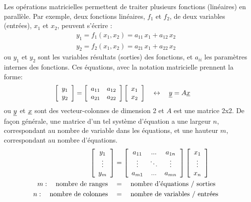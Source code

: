 Les opérations matricielles permettent de traiter plusieurs fonctions (linéaires) en parallèle. Par exemple, deux fonctions linéaires, $f_1$ et $f_2$, de deux variables (entrées), $x_1$ et $x_2$, peuvent s’écrire :
%
\begin{align}
y_1 = f_1(x_1,x_2) = a_{11} \, x_1 + a_{12} \, x_2   \\
y_2 = f_2(x_1,x_2) = a_{21} \, x_1 + a_{22} \, x_2
\end{align}
%
ou $y_1$ et $y_2$ sont les variables résultats (sorties) des fonctions, et $a_{ii}$ les paramètres internes des fonctions. Ces équations, avec la notation matricielle prennent la forme:
%
\begin{align}
\left[ \begin{array}{c} 
	y_1 \\ y_2
\end{array} \right] &= 
\left[ \begin{array}{c c} 
a_{11} & a_{12} \\ a_{21} & a_{22}
\end{array} \right]
\left[ \begin{array}{c} 
	x_1 \\ x_2
\end{array} \right] \quad \leftrightarrow \quad  \underline{y}  =   A  \underline{x} 
\label{eq:sys2}
\end{align}
%
ou $\underline{y}$ et $\underline{x}$ sont des vecteur-colonnes de dimension 2 et $A$ est une matrice 2x2. De façon générale, une matrice d'un tel système d’équation a une largeur $n$, correspondant au nombre de variable dans les équations, et une hauteur $m$, correspondant au nombre d’équations.
%
\begin{align}
\left[ \begin{array}{c} 
	y_1 \\ \vdots \\ y_m
\end{array} \right] &= 
\left[ \begin{array}{c c c} 
a_{11} & ... & a_{1n} \\ \vdots & \ddots  &  \vdots \\ 
a_{m1} & ... & a_{mn}
\end{array} \right]
\left[ \begin{array}{c} 
	x_1 \\ \vdots \\ x_n
\end{array} \right] \\
m: \quad \text{nombre de ranges} \quad&=\quad \text{nombre d’équations / sorties} \\
n: \quad \text{nombre de colonnes} \quad&=\quad \text{nombre de variables / entrées}
\end{align}
%


